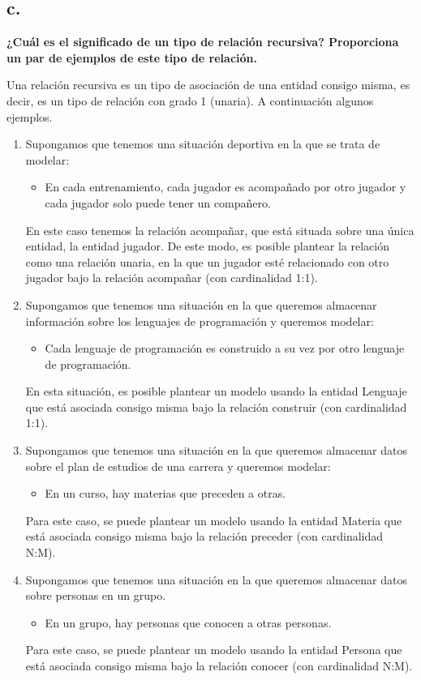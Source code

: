 \subsection*{c. }

    
\textbf{¿Cuál es el significado de un tipo de relación recursiva? Proporciona un par de ejemplos de este tipo de relación.}

Una relación recursiva es un tipo de asociación de una entidad consigo misma, es decir, es un tipo de relación con grado 1 (unaria).  A continuación algunos ejemplos.
\begin{enumerate}
\item Supongamos que tenemos una situación deportiva en la que se trata de modelar:
  \begin{itemize}
  \item En cada entrenamiento, cada jugador es acompañado por otro jugador y cada jugador solo puede tener un compañero.
  \end{itemize}
  En este caso tenemos la relación acompañar, que está situada sobre una única entidad, la entidad jugador. De este modo, es posible plantear la relación como una relación unaria, en la que un jugador esté relacionado con otro jugador bajo la relación acompañar (con cardinalidad 1:1).
  
\item Supongamos que tenemos una situación en la que queremos almacenar información sobre los lenguajes de programación y queremos modelar:
  \begin{itemize}
  \item Cada lenguaje de programación es construido a su vez por otro lenguaje de programación.
  \end{itemize}
  En esta situación, es posible plantear un modelo usando la entidad Lenguaje que está asociada consigo misma bajo la relación construir (con cardinalidad 1:1).
  
\item Supongamos que tenemos una situación en la que queremos almacenar datos sobre el plan de estudios de una carrera y queremos modelar:
  \begin{itemize}        
  \item En un curso, hay materias que preceden a otras.                
  \end{itemize}
  Para este caso, se puede plantear un modelo usando la entidad Materia que está asociada consigo misma bajo la relación preceder (con cardinalidad N:M).
  
\item Supongamos que tenemos una situación en la que queremos almacenar datos sobre personas en un grupo.
  \begin{itemize}
  \item En un grupo, hay personas que conocen a otras personas.            
  \end{itemize}
  Para este caso, se puede plantear un modelo usando la entidad Persona que está asociada consigo misma bajo la relación conocer (con cardinalidad N:M).
  \end{enumerate}
